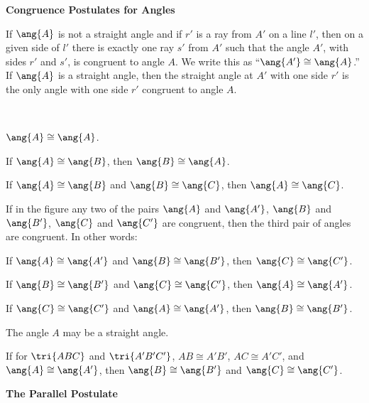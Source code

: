 \documentclass[11pt]{book}
\theoremstyle{bkplain}
\theoremstyle{XIplainnote}
\theoremstyle{bkplain}
\theoremstyle{bkplain}
\newcommand{\APPsub}[1]{%
  \par\medskip\begin{center}\bfseries\small #1\end{center}\par\nopagebreak}
\begin{document}
\APPsub{Congruence Postulates for Angles}

\begin{applist}[resume]
\item If $\ang{A}$ is not a straight angle and if $r'$ is a ray from $A'$ on
      a line $l'$, then on a given side of $l'$ there is exactly one ray
      $s'$ from $A'$ such that the angle $A'$, with sides $r'$ and $s'$, is
      congruent to angle $A$. We write this as ``$\ang{A'} \cong \ang{A}$.''
      If $\ang{A}$ is a straight angle, then the straight angle at $A'$ with
      one side $r'$ is the only angle with one side $r'$ congruent to angle
      $A$.
\item ~
      \begin{applist}
      \item $\ang{A} \cong \ang{A}$.
      \item If $\ang{A} \cong \ang{B}$, then $\ang{B} \cong \ang{A}$.
      \item If $\ang{A} \cong \ang{B}$ and $\ang{B} \cong \ang{C}$, then
            $\ang{A} \cong \ang{C}$.
      \end{applist}
\item If in the figure any two of the pairs $\ang{A}$ and $\ang{A'}$,
      $\ang{B}$ and $\ang{B'}$, $\ang{C}$ and $\ang{C'}$ are congruent, then
      the third pair of angles are congruent. In other words:
      \begin{applist}
      \item If $\ang{A} \cong \ang{A'}$ and $\ang{B} \cong \ang{B'}$, then
            $\ang{C} \cong \ang{C'}$.
      \item If $\ang{B} \cong \ang{B'}$ and $\ang{C} \cong \ang{C'}$, then
            $\ang{A} \cong \ang{A'}$.
      \item If $\ang{C} \cong \ang{C'}$ and $\ang{A} \cong \ang{A'}$, then
            $\ang{B} \cong \ang{B'}$.
      \end{applist}
      The angle $A$ may be a straight angle.
\end{applist}

\FIGAPPONE

\begin{applist}[resume]
\item If for $\tri{ABC}$ and $\tri{A'B'C'}$, $AB \cong A'B'$,
      $AC \cong A'C'$, and $\ang{A} \cong \ang{A'}$, then
      $\ang{B} \cong \ang{B'}$ and $\ang{C} \cong \ang{C'}$.
\end{applist}

\APPsub{The Parallel Postulate}
\end{document}
